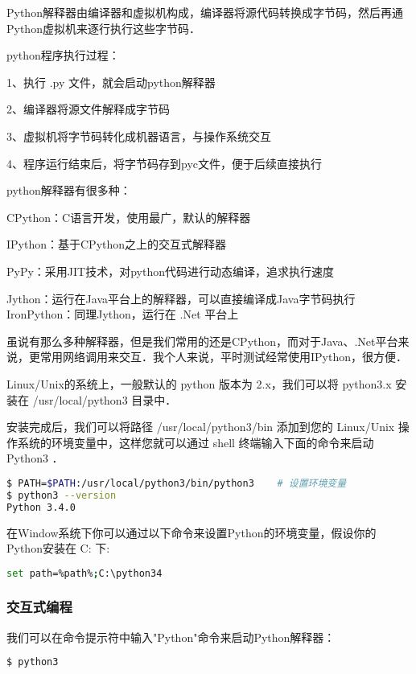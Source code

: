 


Python解释器由编译器和虚拟机构成，编译器将源代码转换成字节码，然后再通Python虚拟机来逐行执行这些字节码．

python程序执行过程：

1、执行 .py 文件，就会启动python解释器

2、编译器将源文件解释成字节码

3、虚拟机将字节码转化成机器语言，与操作系统交互

4、程序运行结束后，将字节码存到pyc文件，便于后续直接执行

python解释器有很多种：

CPython：C语言开发，使用最广，默认的解释器

IPython：基于CPython之上的交互式解释器

PyPy：采用JIT技术，对python代码进行动态编译，追求执行速度

Jython：运行在Java平台上的解释器，可以直接编译成Java字节码执行
IronPython：同理Jython，运行在 .Net 平台上

虽说有那么多种解释器，但是我们常用的还是CPython，而对于Java、.Net平台来说，更常用网络调用来交互．我个人来说，平时测试经常使用IPython，很方便．

Linux/Unix的系统上，一般默认的 python 版本为 2.x，我们可以将 python3.x 安装在 /usr/local/python3 目录中．

安装完成后，我们可以将路径 /usr/local/python3/bin 添加到您的 Linux/Unix 操作系统的环境变量中，这样您就可以通过 shell 终端输入下面的命令来启动 Python3 ．

\begin{lstlisting}[language=bash]
$ PATH=$PATH:/usr/local/python3/bin/python3    # 设置环境变量
$ python3 --version
Python 3.4.0
\end{lstlisting}

在Window系统下你可以通过以下命令来设置Python的环境变量，假设你的Python安装在 C: 下:

\begin{lstlisting}[language=bash]
set path=%path%;C:\python34
\end{lstlisting}

\subsubsection{交互式编程}

我们可以在命令提示符中输入"Python"命令来启动Python解释器：

\begin{lstlisting}[language=bash]
$ python3
\end{lstlisting}

